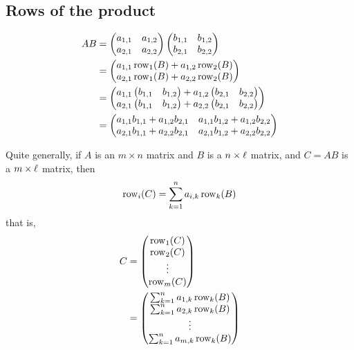\documentclass{ximera}
\begin{document}
\subsection{Rows of the product}


\begin{align*}AB &= \begin{pmatrix}
a_{1,1} & a_{1,2}\\
a_{2,1} & a_{2,2}
\end{pmatrix}
\begin{pmatrix}
b_{1,1} & b_{1,2}\\
b_{2,1} & b_{2,2}
\end{pmatrix}\\
&= \begin{pmatrix}
a_{1,1}\operatorname{row}_1(B) + a_{1,2}\operatorname{row}_2(B) \\ a_{2,1}\operatorname{row}_1(B) +  a_{2,2}\operatorname{row}_2(B)
\end{pmatrix}\\
&= \begin{pmatrix}
a_{1,1}\begin{pmatrix} b_{1,1} & b_{1,2}\end{pmatrix} + a_{1,2}\begin{pmatrix} b_{2,1} & b_{2,2}\end{pmatrix} \\ a_{2,1}\begin{pmatrix} b_{1,1} & b_{1,2}\end{pmatrix} +  a_{2,2}\begin{pmatrix} b_{2,1} & b_{2,2}\end{pmatrix}
\end{pmatrix}\\
&= \begin{pmatrix}
a_{1,1}b_{1,1} + a_{1,2}b_{2,1} & a_{1,1}b_{1,2}+ a_{1,2}b_{2,2}\\
a_{2,1}b_{1,1} + a_{2,2}b_{2,1} & a_{2,1}b_{1,2} + a_{2,2}b_{2,2}
\end{pmatrix}
\end{align*}

Quite generally, if $A$ is an $m\times n$ matrix and $B$ is a $n\times
\ell$ matrix, and $C = AB$ is a $m\times \ell$ matrix, then
\[
\operatorname{row}_i(C) = \sum_{k=1}^n a_{i,k}\operatorname{row}_k(B)
\]
that is,
\begin{align*}
  C &= \begin{pmatrix} \operatorname{row}_1(C) \\ \operatorname{row}_2 (C) \\ \vdots \\ \operatorname{row}_{m}(C) \end{pmatrix}\\
  &=  \begin{pmatrix} \sum_{k=1}^n a_{1,k}\operatorname{row}_k(B) \\ \sum_{k=1}^n a_{2,k}\operatorname{row}_k(B) \\ \vdots \\ \sum_{k=1}^n a_{m,k}\operatorname{row}_k(B)\end{pmatrix}
\end{align*}
\end{document}
